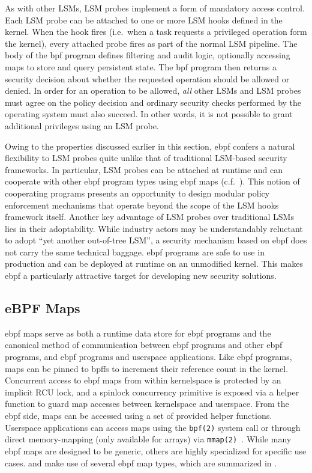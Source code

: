 As with other LSMs, LSM probes implement a form of mandatory access control. Each LSM
probe can be attached to one or more LSM hooks defined in the kernel. When the hook fires
(i.e.~when a task requests a privileged operation form the kernel), every attached probe
fires as part of the normal LSM pipeline. The body of the \gls{bpf} program defines filtering
and audit logic, optionally accessing maps to store and query persistent state. The \gls{bpf}
program then returns a security decision about whether the requested operation should be
allowed or denied.  In order for an operation to be allowed, \textit{all} other LSMs and
LSM probes must agree on the policy decision and ordinary security checks performed by the
operating system must also succeed. In other words, it is not possible to grant additional
privileges using an LSM probe.

Owing to the properties discussed earlier in this section, \gls{ebpf} confers a natural
flexibility to LSM probes quite unlike that of traditional LSM-based security frameworks.
In particular, LSM probes can be attached at runtime and can cooperate with other \gls{ebpf}
program types using \gls{ebpf} maps (c.f.~). This notion of cooperating
programs presents an opportunity to design modular policy enforcement mechanisms that
operate beyond the scope of the LSM hooks framework itself.  Another key advantage of LSM
probes over traditional LSMs lies in their adoptability.  While industry actors may be
understandably reluctant to adopt \enquote{yet another out-of-tree LSM}, a security
mechanism based on \gls{ebpf} does not carry the same technical baggage.  \gls{ebpf} programs are safe
to use in production and can be deployed at runtime on an unmodified kernel.  This makes
\gls{ebpf} a particularly attractive target for developing new security solutions.

\subsection{eBPF Maps}%
\label{ss:bpf-maps-bg}

\gls{ebpf} maps serve as both a runtime data store for \gls{ebpf} programs and the canonical method of
communication between \gls{ebpf} programs and other \gls{ebpf} programs, and \gls{ebpf} programs and
userspace applications. Like \gls{ebpf} programs, maps can be pinned to \gls{bpffs} to
increment their reference count in the kernel. Concurrent access to \gls{ebpf} maps from within
kernelspace is protected by an implicit RCU lock, and a spinlock concurrency primitive is
exposed via a helper function to guard map accesses between kernelspace and userspace.
From the \gls{ebpf} side, maps can be accessed using a set of provided helper functions.
Userspace applications can access maps using the \texttt{bpf(2)} system call or through
direct memory-mapping (only available for arrays) via
\texttt{mmap(2)~\cite{gregg2019_bpf}}. While many \gls{ebpf} maps are designed to be generic,
others are highly specialized for specific use cases. \bpfcontain{} and \bpfbox{} make
use of several \gls{ebpf} map types, which are summarized in .

